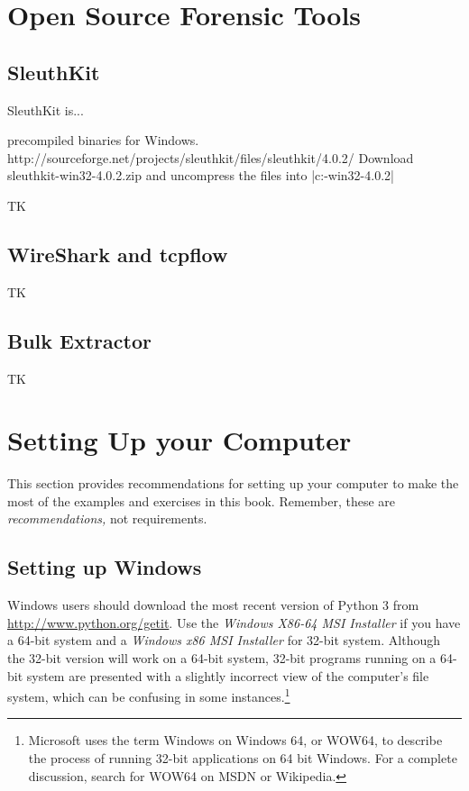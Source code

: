 \section{Open Source Forensic Tools}

\subsection{SleuthKit}

SleuthKit is...

precompiled binaries for
Windows. http://sourceforge.net/projects/sleuthkit/files/sleuthkit/4.0.2/
  Download sleuthkit-win32-4.0.2.zip and uncompress the files into
  |c:\sleuthkit-win32-4.0.2|




TK

\subsection{WireShark and tcpflow}

TK

\subsection{Bulk Extractor}

TK

\section{Setting Up your Computer}
This section provides recommendations for setting up your computer to
make the most of the examples and exercises in this book. Remember,
these are \emph{recommendations,} not requirements.

\subsection{Setting up Windows}
Windows users should download the most recent version of Python 3 from
\url{http://www.python.org/getit}. Use the \emph{Windows X86-64 MSI
  Installer} if you have a 64-bit system and a \emph{Windows x86 MSI
  Installer} for 32-bit system. Although the 32-bit version will work
on a 64-bit system, 32-bit programs running on a 64-bit system are
presented with a slightly incorrect view of the computer's file
system, which can be confusing in some instances.\footnote{Microsoft
  uses the term Windows on Windows 64, or WOW64, to describe the
  process of running 32-bit applications on 64 bit Windows. For a
  complete discussion, search for WOW64 on MSDN or Wikipedia.}

